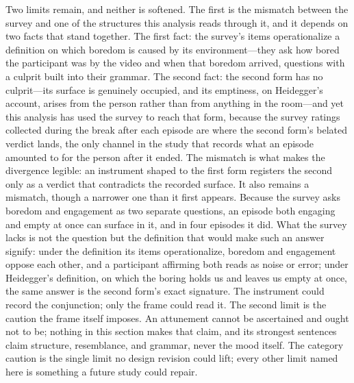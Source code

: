 Two limits remain, and neither is softened. The first is the mismatch between the survey and
one of the structures this analysis reads through it, and it depends on two facts that stand
together. The first fact: the survey's items operationalize a definition on which boredom is
caused by its environment---they ask how bored the participant was by the video and when that
boredom arrived, questions with a culprit built into their grammar. The second fact: the
second form has no culprit---its surface is genuinely occupied, and its emptiness, on
Heidegger's account, arises from the person rather than from anything in the room---and yet
this analysis has used the survey to reach that form, because the survey ratings collected
during the break after each episode are where the second form's belated verdict lands, the
only channel in the study that records what an episode amounted to for the person after it
ended. The mismatch is what makes the divergence legible: an instrument shaped to the first
form registers the second only as a verdict that contradicts the recorded surface. It also
remains a mismatch, though a narrower one than it first appears. Because the survey asks
boredom and engagement as two separate questions, an episode both engaging and empty at once
can surface in it, and in four episodes it did. What the survey lacks is not the question but
the definition that would make such an answer signify: under the definition its items
operationalize, boredom and engagement oppose each other, and a participant affirming both
reads as noise or error; under Heidegger's definition, on which the boring holds us and
leaves us empty at once, the same answer is the second form's exact signature. The instrument
could record the conjunction; only the frame could read it. The second limit
is the caution the frame itself imposes. An attunement cannot be ascertained and ought not to be; nothing in
this section makes that claim, and its strongest sentences claim structure, resemblance, and
grammar, never the mood itself. The category caution is the single limit no design revision
could lift; every other limit named here is something a future study could repair.
